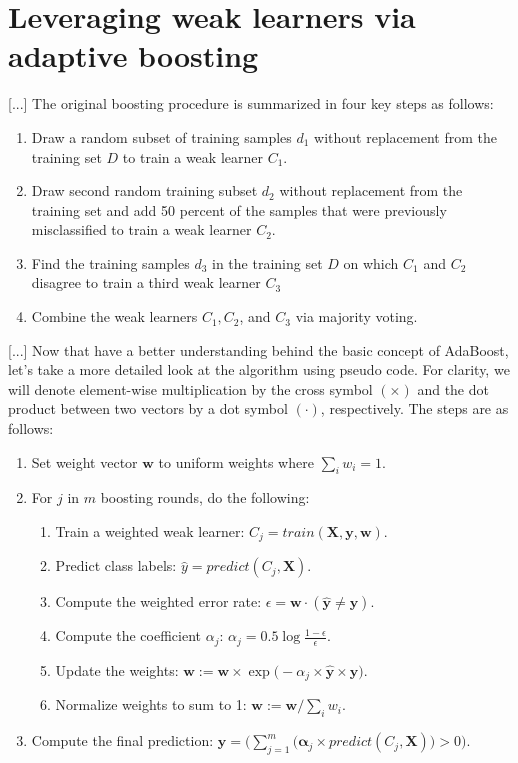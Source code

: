\documentclass[letterpaper]{report}
\begin{document}
\section{Leveraging weak learners via adaptive boosting}

[...] The original boosting procedure is summarized in four key steps as follows:

\begin{enumerate}
\item Draw a random subset of training samples $d_1$ without replacement from the training set $D$ to train a weak learner $C_1$.
\item Draw second random training subset $d_2$ without replacement from the training set and add 50 percent of the samples that were previously misclassified to train a weak learner $C_2$.
\item Find the training samples $d_3$ in the training set $D$ on which $C_1$ and $C_2$ disagree to train a third weak learner $C_3$
\item Combine the weak learners $C_1, C_2$, and $C_3$ via majority voting.
\end{enumerate}

[...] Now that have a better understanding behind the basic concept of AdaBoost, let's take a more detailed look at the algorithm using pseudo code. For clarity, we will denote element-wise multiplication by the cross symbol $(\times)$ and the dot product between two vectors by a dot symbol $(\cdot)$, respectively. The steps are as follows:

\begin{enumerate}
\item Set weight vector $\mathbf{w}$ to uniform weights where $\sum_i  w_i = 1$.
\item For $j$ in $m$ boosting rounds, do the following:
\begin{enumerate}
\item Train a weighted weak learner: $C_j = train(\mathbf{X, y, w})$.
\item Predict class labels: $\hat{y} = predict(C_j, \mathbf{X})$.
\item Compute the weighted error rate: $\epsilon = \mathbf{w} \cdot (\mathbf{\hat{y}} \neq \mathbf{y})$.
\item Compute the coefficient $\alpha_j$: $\alpha_j=0.5 \log \frac{1 - \epsilon}{\epsilon}$.
\item Update the weights: $\mathbf{w} := \mathbf{w} \times \exp \big( -\alpha_j \times \mathbf{\hat{y}} \times \mathbf{y} \big)$.
\item Normalize weights to sum to 1: $\mathbf{w}:= \mathbf{w} / \sum_i w_i$.
\end{enumerate}
\item Compute the final prediction: $\mathbf{\hat{y}} = \big( \sum^{m}_{j=1} \big( \mathbf{\alpha}_j \times predict(C_j, \mathbf{X})  \big) > 0 \big)$.
\end{enumerate}
\end{document}
